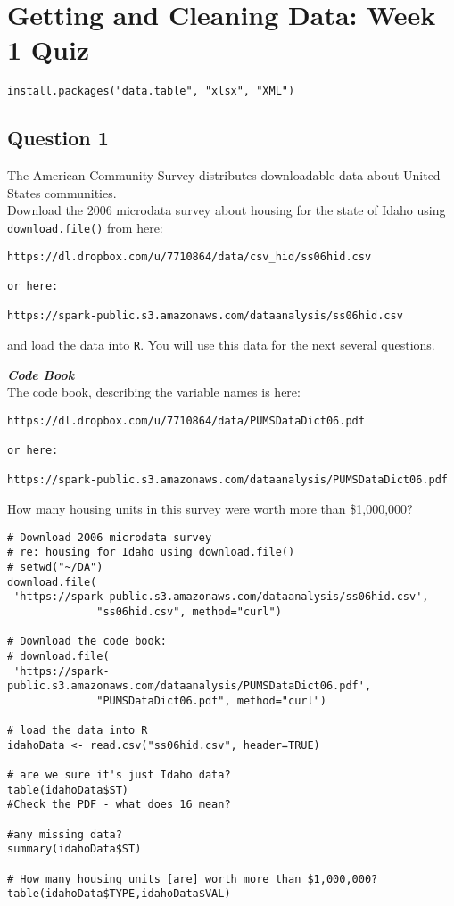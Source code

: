 \documentclass[]{article}
\begin{document}
\section{Getting and Cleaning Data: Week 1 Quiz}
\begin{verbatim}
install.packages("data.table", "xlsx", "XML")
\end{verbatim}
\newpage
\subsection*{Question 1}

The American Community Survey distributes downloadable data about United States communities. \\
Download the 2006 microdata survey about housing for the state of Idaho using \texttt{download.file()} from here: 

\begin{verbatim}
https://dl.dropbox.com/u/7710864/data/csv_hid/ss06hid.csv

or here:

https://spark-public.s3.amazonaws.com/dataanalysis/ss06hid.csv 
\end{verbatim}
and load the data into \texttt{R}. You will use this data for the next several questions. 

\noindent \textbf{\textit{Code Book}}\\
The code book, describing the variable names is here: 

\begin{verbatim}
https://dl.dropbox.com/u/7710864/data/PUMSDataDict06.pdf

or here: 

https://spark-public.s3.amazonaws.com/dataanalysis/PUMSDataDict06.pdf
\end{verbatim}
\bigskip
How many housing units in this survey were worth more than \$1,000,000?

\begin{framed}
\begin{verbatim}
# Download 2006 microdata survey 
# re: housing for Idaho using download.file()
# setwd("~/DA")
download.file(
 'https://spark-public.s3.amazonaws.com/dataanalysis/ss06hid.csv',
              "ss06hid.csv", method="curl")

# Download the code book:
# download.file(
 'https://spark-public.s3.amazonaws.com/dataanalysis/PUMSDataDict06.pdf',
              "PUMSDataDict06.pdf", method="curl")

# load the data into R
idahoData <- read.csv("ss06hid.csv", header=TRUE)

# are we sure it's just Idaho data?
table(idahoData$ST)
#Check the PDF - what does 16 mean?

#any missing data?
summary(idahoData$ST)

# How many housing units [are] worth more than $1,000,000?
table(idahoData$TYPE,idahoData$VAL)
\end{verbatim}
\end{framed}
\end{document}
